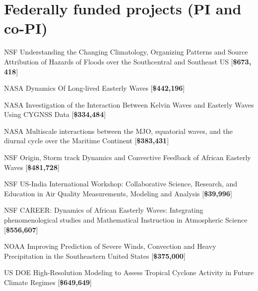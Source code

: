 \section*{Federally funded projects (PI and co-PI)}
\begin{tlist}

\item[NSF] Understanding the Changing Climatology, Organizing Patterns and Source Attribution of Hazards of Floods over the Southcentral and Southeast US   [{\bf \$673, 418}]
        \vspace{2mm}


  
\item[NASA] Dynamics Of Long-lived Easterly Waves  [{\bf \$442,196}]
        \vspace{2mm}
  
  
\item[NASA] Investigation of the Interaction Between Kelvin Waves and Easterly Waves Using CYGNSS Data  [{\bf \$334,484}]
        \vspace{2mm}

\item[NASA] Multiscale interactions between the MJO, equatorial waves, and the diurnal cycle over the Maritime Continent [{\bf\$383,431}]
              \vspace{2mm}

\item[NSF]  Origin, Storm track Dynamics and Convective Feedback of African Easterly Waves [{\bf \$481,728}]
               \vspace{2mm}

\item[NSF]  US-India International Workshop: Collaborative Science, Research, and Education in Air Quality Measurements, Modeling and Analysis [{\bf \$39,996}]
               \vspace{2mm}

\item[NSF]  CAREER: Dynamics of African Easterly Waves: Integrating phenomenological studies and Mathematical Instruction in Atmospheric Science [{\bf \$556,607}]
               \vspace{2mm}

\item[NOAA] Improving Prediction of Severe Winds, Convection and Heavy Precipitation in the Southeastern United States [{\bf\$375,000}]
               \vspace{2mm}

\item[US DOE] High-Resolution Modeling to Assess Tropical Cyclone Activity in Future Climate Regimes [{\bf\$649,649}]
\end{tlist}



